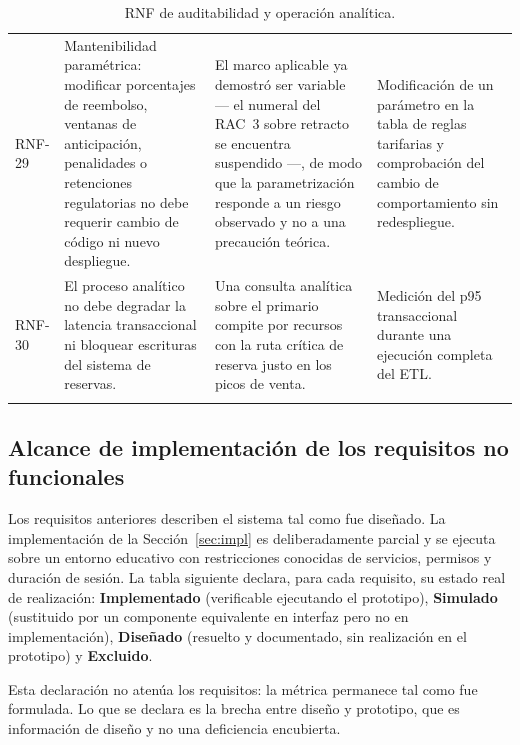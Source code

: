 \documentclass[10pt,letterpaper]{article}
\begin{document}
\begin{longtable}{@{}L{1.5cm} L{5.0cm} L{4.6cm} L{4.9cm}@{}}
RNF-29 & Mantenibilidad paramétrica: modificar porcentajes de reembolso, ventanas de anticipación, penalidades o retenciones regulatorias no debe requerir cambio de código ni nuevo despliegue. & El marco aplicable ya demostró ser variable --- el numeral del RAC~3 sobre retracto se encuentra suspendido ---, de modo que la parametrización responde a un riesgo observado y no a una precaución teórica. & Modificación de un parámetro en la tabla de reglas tarifarias y comprobación del cambio de comportamiento sin redespliegue. \\
RNF-30 & El proceso analítico no debe degradar la latencia transaccional ni bloquear escrituras del sistema de reservas. & Una consulta analítica sobre el primario compite por recursos con la ruta crítica de reserva justo en los picos de venta. & Medición del p95 transaccional durante una ejecución completa del ETL. \\
\bottomrule
\caption{RNF de auditabilidad y operación analítica.}
\end{longtable}

\subsection{Alcance de implementación de los requisitos no funcionales}
Los requisitos anteriores describen el sistema tal como fue diseñado. La implementación de la Sección~\ref{sec:impl} es deliberadamente parcial y se ejecuta sobre un entorno educativo con restricciones conocidas de servicios, permisos y duración de sesión. La tabla siguiente declara, para cada requisito, su estado real de realización: \textbf{Implementado} (verificable ejecutando el prototipo), \textbf{Simulado} (sustituido por un componente equivalente en interfaz pero no en implementación), \textbf{Diseñado} (resuelto y documentado, sin realización en el prototipo) y \textbf{Excluido}.

Esta declaración no atenúa los requisitos: la métrica permanece tal como fue formulada. Lo que se declara es la brecha entre diseño y prototipo, que es información de diseño y no una deficiencia encubierta.
\end{document}
